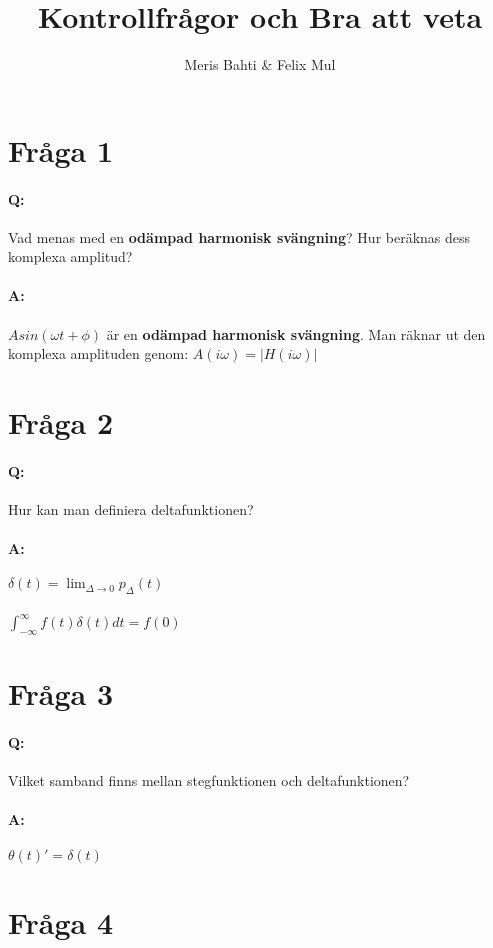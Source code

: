 \documentclass[a4paper]{article}
\title{Kontrollfrågor och Bra att veta}
\author{Meris Bahti \& Felix Mul}
\begin{document}
\maketitle
\newpage
\section{Fråga 1}
\paragraph{Q:} Vad menas med en \textbf{odämpad harmonisk svängning}? Hur beräknas dess komplexa amplitud?
\paragraph{A:} $Asin(\omega t + \phi)$ är en \textbf{odämpad harmonisk svängning}. Man räknar ut den komplexa amplituden genom: $A(i\omega)=|H(i\omega)|$

\section{Fråga 2}
\paragraph{Q:} Hur kan man definiera deltafunktionen?
\paragraph{A:} $\delta(t)=\lim_{\Delta \rightarrow 0}p_\Delta(t)$
\\
\\
$\int_{-\infty}^{\infty} f(t)\delta(t)dt=f(0)$

\section{Fråga 3}
\paragraph{Q:} Vilket samband finns mellan stegfunktionen och deltafunktionen?
\paragraph{A:} $\theta(t)' = \delta(t)$

\section{Fråga 4}
\end{document}
